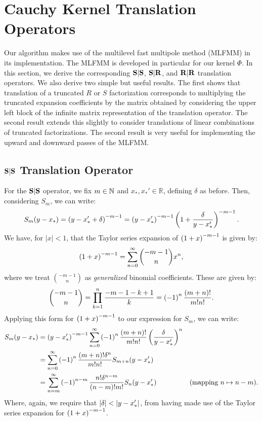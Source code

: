 \section{Cauchy Kernel Translation Operators}

Our algorithm makes use of the multilevel fast multipole method
(MLFMM) in its implementation. The MLFMM is developed in particular
for our kernel $\Phi$. In this section, we derive the corresponding
$\bold{S}|\bold{S}$, $\bold{S}|\bold{R}$, and $\bold{R}|\bold{R}$ translation operators. We also derive
two simple but useful results. The first shows that translation of a
truncated $R$ or $S$ factorization corresponds to multiplying the
truncated expansion coefficients by the matrix obtained by considering
the upper left block of the infinite matrix representation of the
translation operator. The second result extends this slightly to
consider translations of linear combinations of truncated
factorizations. The second result is very useful for implementing the
upward and downward passes of the MLFMM.\@

\subsection{$\bold{S}|\bold{S}$ Translation Operator}

For the $\bold{S}|\bold{S}$
operator, we fix $m \in \mathbb{N}$
and $x_*, x_*' \in \mathbb{R}$,
defining $\delta$ as before. Then, considering $S_m$, we can write:
\begin{align*}
  S_m(y - x_*) = \left(y - x_*' + \delta\right)^{-m-1} = \left(y - x_*'\right)^{-m-1} \left(1 + {\delta \over y - x_*'}\right)^{-m-1}.
\end{align*}
We have, for $|x| < 1$,
that the Taylor series expansion of $\left(1 + x\right)^{-m-1}$
is given by:
\begin{align*}
  \left(1 + x\right)^{-m-1} = \sum_{n=0}^\infty {-m-1 \choose n} x^n,
\end{align*}
where we treat ${-m-1 \choose n}$
as \emph{generalized} binomial coefficients. These are given by:
\begin{align*}
  {-m-1 \choose n} = \prod_{k=1}^n {-m-1-k+1 \over k} = \left(-1\right)^n {(m+n)! \over m!n!}.
\end{align*}
Applying this form for $\left(1 + x\right)^{-m-1}$
to our expression for $S_m$, we can write:
\begin{align*}
  S_m(y - x_*)
  &= \left(y - x_*'\right)^{-m-1} \sum_{n=0}^\infty \left(-1\right)^n {\left(m + n\right)! \over m! n!} \left(\delta \over y - x_*'\right)^n \\
  &= \sum_{n = 0}^\infty \left(-1\right)^n {\left(m + n\right)! \delta^n \over m! n!} S_{m+n}(y - x_*') \\
  &= \sum_{n = m}^\infty \left(-1\right)^{n-m} {n! \delta^{n-m} \over \left(n - m\right)! m!} S_n(y-x_*') & \mbox{(mapping $n \mapsto n - m$)}.
\end{align*}
Where, again, we require that $\left|\delta\right| < \left|y - x_*'\right|$,
from having made use of the Taylor series expansion for
$\left(1 + x\right)^{-m-1}$.

